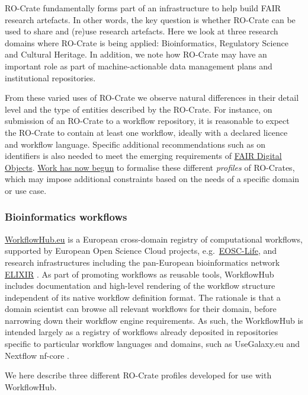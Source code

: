 {RO-Crate fundamentally forms part of an infrastructure to help build
FAIR research artefacts. In other words, the key question is whether
RO-Crate can be used to share and (re)use research artefacts. Here we
look at three research domains where RO-Crate is being applied:
Bioinformatics, Regulatory Science and Cultural Heritage. In addition,
we note how RO-Crate may have an important role as part of
machine-actionable data management plans and institutional repositories.

From these varied uses of RO-Crate we observe natural differences in
their detail level and the type of entities described by the RO-Crate.
For instance, on submission of an RO-Crate to a workflow repository, it
is reasonable to expect the RO-Crate to contain at least one workflow,
ideally with a declared licence and workflow language. Specific
additional recommendations such as on identifiers is also needed to meet
the emerging requirements of \href{https://fairdo.org/}{FAIR Digital
Objects}.
\href{https://github.com/ResearchObject/ro-crate/issues/153}{Work has
now begun} to formalise these different \emph{profiles} of RO-Crates,
which may impose additional constraints based on the needs of a specific
domain or use case.

\hypertarget{workflows}{%
\subsubsection{Bioinformatics workflows}\label{workflows}}

\href{https://workflowhub.eu/}{WorkflowHub.eu} is a European
cross-domain registry of computational workflows, supported by European
Open Science Cloud projects,
e.g.~\href{https://www.eosc-life.eu/}{EOSC-Life}, and research
infrastructures including the pan-European bioinformatics network
\href{https://elixir-europe.org/}{ELIXIR}
\cite{ch5-34}. As part
of promoting workflows as reusable tools, WorkflowHub includes
documentation and high-level rendering of the workflow structure
independent of its native workflow definition format. The rationale is
that a domain scientist can browse all relevant workflows for their
domain, before narrowing down their workflow engine requirements. As
such, the WorkflowHub is intended largely as a registry of workflows
already deposited in repositories specific to particular workflow
languages and domains, such as UseGalaxy.eu
\cite{Baker 2020} and
Nextflow nf-core
\cite{Ewels 2020}.

We here describe three different RO-Crate profiles developed for use
with WorkflowHub.

}
